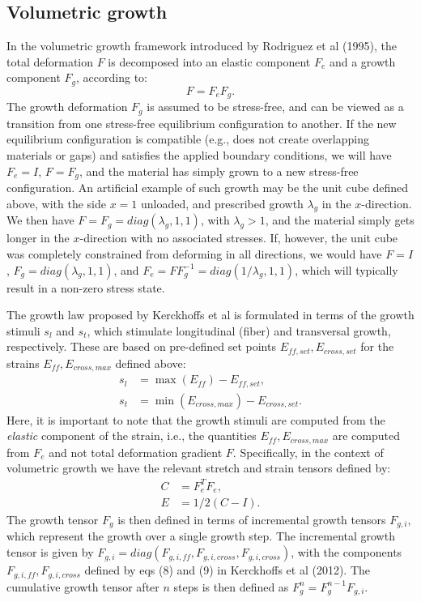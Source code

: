 \documentclass[a4paper,10pt]{article}
\begin{document}
\subsection{Volumetric growth}
In the volumetric growth framework introduced by 
Rodriguez et al (1995), the total deformation $F$ is decomposed into an elastic component $F_e$ and a growth
component $F_g$, according to:
\[
  F = F_e F_g . 
\]
The growth deformation $F_g$ is assumed to be stress-free, and can be viewed as a transition from one stress-free 
equilibrium configuration to another. If the new equilibrium configuration is compatible (e.g., does not create
overlapping materials or gaps) and satisfies the applied boundary conditions, we will have $F_e = I$, $F=F_g$, and the
material has simply grown to a new stress-free configuration. An artificial example of such growth may be the unit cube 
defined above, with the side $x=1$ unloaded, and prescribed growth $\lambda_g$ in the $x$-direction. 
We then have $F=F_g= diag(\lambda_g, 1, 1)$, with $\lambda_g > 1$, and the
material simply gets longer in the $x$-direction with no associated stresses. If, however, the unit cube was completely 
constrained from deforming in all directions, we would have $F = I$, $F_g= diag(\lambda_g, 1, 1)$, and 
$F_e = F F_g^{-1} = diag(1/\lambda_g, 1, 1)$, which will typically result in a non-zero stress state. 

The growth law proposed by Kerckhoffs et al is formulated in terms of the growth stimuli $s_l$ and $s_t$, 
which stimulate longitudinal (fiber) and transversal growth, respectively. These are based on pre-defined
set points $E_{ff,set}, E_{cross,set}$ for the strains $E_{ff}, E_{cross,max}$ defined above:
\begin{align*}
  s_l &= \max(E_{ff}) - E_{ff,set}, \\
  s_t &= \min(E_{cross,max}) - E_{cross,set} .
\end{align*}
Here, it is important to note that the growth stimuli are computed from the \emph{elastic} component of the strain,
i.e., the quantities $E_{ff}, E_{cross,max}$ are computed from $F_e$ and not total deformation gradient $F$. 
Specifically, in the context of volumetric growth we have the relevant stretch and strain tensors defined by:
\begin{align*}
  C &= F_e^TF_e ,\\
  E &= 1/2(C - I) .
\end{align*}
The growth tensor $F_g$ is then defined in terms of incremental growth tensors $F_{g,i}$, which represent the
growth over a single growth step. The incremental growth tensor is given  
by $F_{g,i}= diag(F_{g,i,ff}, F_{g,i,cross}, F_{g,i,cross})$, with the components 
$F_{g,i,ff}, F_{g,i,cross}$ defined by eqs (8) and (9) in Kerckhoffs et al (2012). The cumulative growth tensor
after $n$ steps is then defined as $F_g^n = F_g^{n-1} F_{g,i}$.
\end{document}
